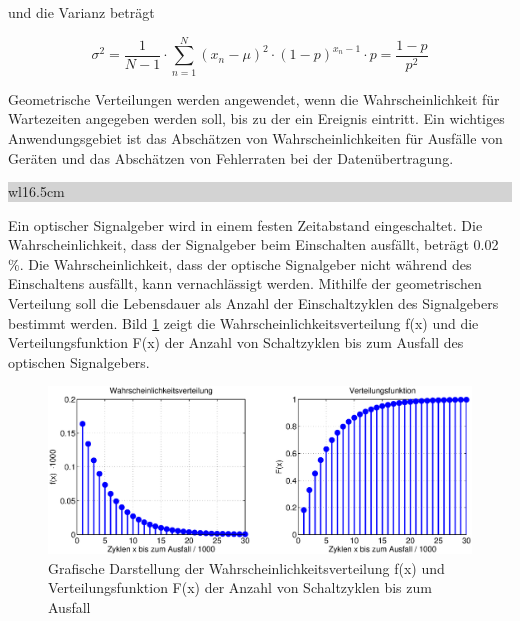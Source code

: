 \noindent und die Varianz betr\"{a}gt

\begin{equation}\label{eq:fourhundredsixtyone}
\sigma ^{2} =\dfrac{1}{N-1} \cdot \sum _{n=1}^{N}\left(x_{n} -\mu \right)^{2} \cdot (1-p)^{x_{n} -1} \cdot p =\dfrac{1-p}{p^{2} }
\end{equation}

\noindent Geometrische Verteilungen werden angewendet, wenn die Wahrscheinlichkeit f\"{u}r Wartezeiten angegeben werden soll, bis zu der ein Ereignis eintritt. Ein wichtiges Anwendungsgebiet ist das Absch\"{a}tzen von Wahrscheinlichkeiten f\"{u}r Ausf\"{a}lle von Ger\"{a}ten und das Absch\"{a}tzen von Fehlerraten bei der Daten\"{u}bertragung.\bigskip

\noindent
\colorbox{lightgray}{%
%
\renewcommand\arraystretch{0.6}%
\begin{tabular}{ wl{16.5cm} }
{\selectfont{Beispiel: Lebensdauer eines optischen Signalgebers}}
\end{tabular}%
}\medskip 

\noindent Ein optischer Signalgeber wird in einem festen Zeitabstand eingeschaltet. Die Wahrscheinlichkeit, dass der Signalgeber beim Einschalten ausf\"{a}llt, betr\"{a}gt 0.02 \%. Die Wahrscheinlichkeit, dass der optische Signalgeber nicht w\"{a}hrend des Einschaltens ausf\"{a}llt, kann vernachl\"{a}ssigt werden. Mithilfe der geometrischen Verteilung soll die Lebensdauer als Anzahl der Einschaltzyklen des Signalgebers bestimmt werden. Bild \ref{fig:Diskret_Geometrische_LebensdauerSignalgeber} zeigt die Wahrscheinlichkeitsverteilung f(x) und die Verteilungsfunktion F(x) der Anzahl von Schaltzyklen bis zum Ausfall des optischen Signalgebers.

\clearpage

\noindent 
\begin{figure}[H]
  \centerline{\includegraphics[width=1\textwidth]{Kapitel4/Bilder/image20}}
  \caption{Grafische Darstellung der Wahrscheinlichkeitsverteilung f(x) und Verteilungsfunktion F(x) der Anzahl von Schaltzyklen bis zum Ausfall}
  \label{fig:Diskret_Geometrische_LebensdauerSignalgeber}
\end{figure}

